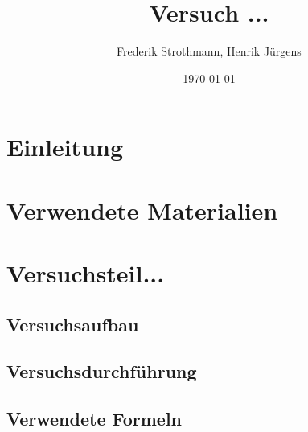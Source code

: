 \documentclass[12pt,a4paper]{article}
\title{Versuch ...\\}
\author{Frederik Strothmann, Henrik Jürgens}
\date{\today}
\begin{document}
\maketitle
\newpage
\tableofcontents
\newpage
\section{Einleitung}
\section{Verwendete Materialien}
\section{Versuchsteil...}
\subsection{Versuchsaufbau}
\subsection{Versuchsdurchführung}
\subsection{Verwendete Formeln}
\end{document}
